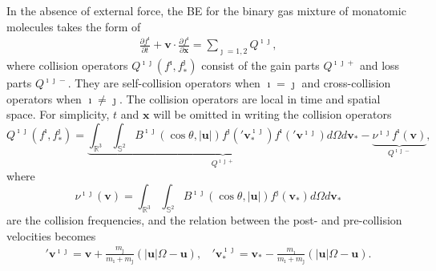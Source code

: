 In the absence of external force, the BE for the binary gas mixture of monatomic molecules takes the form of
\begin{equation}\label{Boltzmann_2}
\begin{split}
 \frac{\partial f^\imath}{\partial t}+{\textbf{v}}\cdot\frac{\partial
f^\imath}{\partial \textbf{x}}=\sum_{\jmath=1,2}Q^{\imath\jmath}, %
\end{split}
\end{equation}
where collision operators $Q^{\imath\jmath}(f^\imath,f^\jmath_*)$ consist of the gain parts $Q^{\imath\jmath+}$ and loss parts $Q^{\imath\jmath-}$. They are self-collision operators when $\imath=\jmath$ and cross-collision operators when $\imath\neq\jmath$. The collision operators are local in time and spatial space. For simplicity, $t$ and $\textbf{x}$ will be omitted in writing the collision operators
\begin{equation}\label{collision_binary}
Q^{\imath\jmath}(f^\imath,f^\jmath_*)=\underbrace{\int_{\mathbb{R}^3}\int_{\mathbb{S}^{2}}B^{\imath\jmath}(\cos\theta,|\textbf{u}|)
    f^\jmath('\textbf{v}^{\imath\jmath}_{\ast})f^\imath('\textbf{v}^{\imath\jmath})d\Omega
    d\textbf{v}_\ast}_{Q^{\imath\jmath+}}-\underbrace{\nu^{\imath\jmath}f^\imath(\textbf{v})}_{Q^{\imath\jmath-}},
\end{equation}
where
\begin{equation}
\nu^{\imath\jmath}(\textbf{v})=\int_{\mathbb{R}^3}\int_{\mathbb{S}^{2}}B^{\imath\jmath}(\cos\theta,|\textbf{u}|)
    f^\jmath(\textbf{v}_{\ast})d\Omega    d\textbf{v}_\ast
\end{equation}
are the collision frequencies, and the relation between the post- and pre-collision velocities becomes
\begin{equation}\label{collision_velocity_binary}
\begin{split}
'\textbf{v}^{\imath\jmath}=\textbf{v} 
+\frac{m_\jmath}{m_\imath+m_\jmath}(|\textbf{u}|\Omega-\textbf{u}),\ \ \ \
'\textbf{v}^{\imath\jmath}_\ast=\textbf{v}_\ast-\frac{m_\imath}{m_\imath+m_\jmath}(|\textbf{u}|\Omega-\textbf{u}).
\end{split}
\end{equation}


